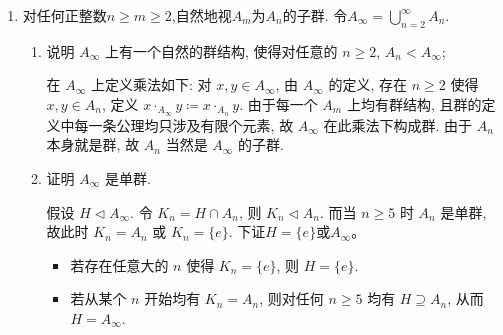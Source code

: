 \begin{enumerate}
\begin{enumerate}[label=(\arabic*)]
\begin{solution}
    综上所述, $A_4$ 的所有正规子群为: $\{e\}$, $V$, $A_4$. 
\end{solution}

\end{enumerate}

\item 对任何正整数$n \geqslant m \geqslant 2$,自然地视$A_{m}$为$A_{n}$的子群.
令$A_{\infty} = \bigcup\limits_{n=2}^{\infty} A_{n}$.
\begin{enumerate}[label=(\arabic*)]
\item 说明 $A_{\infty}$ 上有一个自然的群结构, 使得对任意的 $n \geqslant 2$, $A_n<A_{\infty}$;
\begin{solution}
    在 $A_{\infty}$ 上定义乘法如下:
    对 $x,y\in A_{\infty}$,
    由 $A_{\infty}$ 的定义,
    存在 $n\geqslant 2$ 使得 $x,y\in A_n$,
    定义 $x\cdot_{A_{\infty}}y \coloneqq x\cdot_{A_n}y$.
    由于每一个 $A_m$ 上均有群结构,
    且群的定义中每一条公理均只涉及有限个元素,
    故 $A_{\infty}$ 在此乘法下构成群.
    由于 $A_n$ 本身就是群,
    故 $A_n$ 当然是 $A_{\infty}$ 的子群. 
\end{solution}

\item 证明 $A_{\infty}$ 是单群.
\begin{solution}
    假设 $H \triangleleft A_{\infty}$.
    令 $K_n = H \cap A_n$,
    则 $K_n \triangleleft A_n$.
    而当 $n\geqslant 5$ 时 $A_n$ 是单群,
    故此时 $K_n=A_n$ 或 $K_n=\{e\}$. 下证$H=\{e\}$或$A_\infty$。
    \begin{itemize}
    \item 若存在任意大的 $n$ 使得 $K_n=\{e\}$, 则 $H = \{e\}$. 
    \item 若从某个 $n$ 开始均有 $K_n=A_n$,
    则对任何 $n\geqslant 5$ 均有 $H \supseteq A_n$,
    从而 $H = A_{\infty}$.\qedhere
    \end{itemize}
\end{solution}
\end{enumerate}


\end{enumerate}
